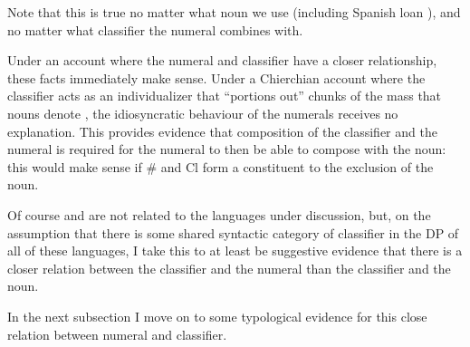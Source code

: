 \documentclass[output=paper
,modfonts
,nonflat]{langsci/langscibook}
\begin{document}
\begin{minipage}{.5\linewidth}

\ea \label{ex:hall:46}

\z
\z

\end{minipage}
\begin{minipage}{.5\linewidth}

\ea \label{ex:hall:47}

\z
\z
\end{minipage} \vspace{0.2cm}

Note that this is true no matter what noun we use (including Spanish loan ), and no matter what classifier the numeral combines with. 

Under an account where the numeral and classifier have a closer relationship, these facts immediately make sense. Under a Chierchian account where the classifier acts as an individualizer that ``portions out'' chunks of the mass that nouns denote \citep{Chierchia1998b}, the idiosyncratic behaviour of the numerals receives no explanation. This provides evidence that composition of the classifier and the numeral is required for the numeral to then be able to compose with the noun: this would make sense if \# and Cl form a constituent to the exclusion of the noun.

Of course  and  are not related to the languages under discussion, but, on the assumption that there is some shared syntactic category of classifier in the DP of all of these languages, I take this to at least be suggestive evidence that there is a closer relation between the classifier and the numeral than the classifier and the noun. 

In the next subsection I move on to some typological evidence for this close relation between numeral and classifier. 
\end{document}
